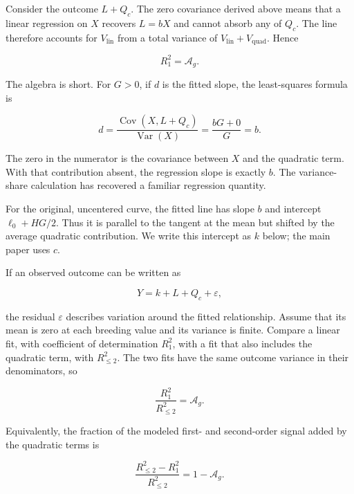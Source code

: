 \documentclass[11pt]{article}
\newcommand{\Var}{\operatorname{Var}}
\newcommand{\Cov}{\operatorname{Cov}}
\newcommand{\Ag}{\ensuremath{\mathcal A_g}}
\newcommand{\Vlin}{\ensuremath{V_{\mathrm{lin}}}}
\newcommand{\Vquad}{\ensuremath{V_{\mathrm{quad}}}}
\begin{document}
Consider the outcome $L+Q_c$.  The zero covariance derived above means that a
linear regression on $X$ recovers $L=bX$ and cannot absorb any of $Q_c$.  The
line therefore accounts for $\Vlin$ from a total variance of
$\Vlin+\Vquad$.  Hence

\begin{equation}
R_1^2=\Ag.
\label{eq:guide-projection}
\end{equation}

The algebra is short.  For $G>0$, if $d$ is the fitted slope, the
least-squares formula is

\begin{equation}
d=\frac{\Cov(X,L+Q_c)}{\Var(X)}
=\frac{bG+0}{G}=b.
\label{eq:guide-one-trait-slope}
\end{equation}

The zero in the numerator is the covariance between $X$ and the quadratic term. With that contribution absent, the regression slope is exactly $b$. The variance-share calculation has recovered a familiar regression quantity.

For the original, uncentered curve, the fitted line has slope $b$ and intercept $\ell_0+HG/2$. Thus it is parallel to the tangent at the mean but shifted by the average quadratic contribution. We write this intercept as $k$ below; the main paper uses $c$.

If an observed outcome can be written as

\begin{equation}
Y=k+L+Q_c+\varepsilon,
\end{equation}

the residual $\varepsilon$ describes variation around the fitted relationship. Assume that its mean is zero at each breeding value and its variance is finite. Compare a linear fit, with coefficient of determination $R_1^2$, with a fit that also includes the quadratic term, with $R_{\leq2}^2$. The two fits have the same outcome variance in their denominators, so

\begin{equation}
\frac{R_1^2}{R_{\leq2}^2}=\Ag.
\label{eq:guide-nested-r2}
\end{equation}

Equivalently, the fraction of the modeled first- and second-order signal
added by the quadratic terms is

\begin{equation}
\frac{R_{\leq2}^2-R_1^2}{R_{\leq2}^2}=1-\Ag.
\end{equation}
\end{document}
